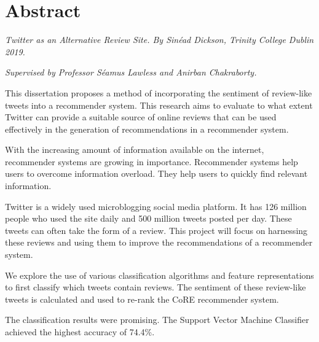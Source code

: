 \chapter{Abstract}


\emph{Twitter as an Alternative Review Site. By Sinéad Dickson, Trinity College Dublin 2019.}

\emph{Supervised by Professor Séamus Lawless and Anirban Chakraborty.}

This dissertation proposes a method of incorporating the sentiment of review-like tweets into a recommender system. This research aims to evaluate to what extent Twitter can provide a suitable source of online reviews that can be used effectively in the generation of recommendations in a recommender system. 

With the increasing amount of information available on the internet, recommender systems are growing in importance. Recommender systems help users to overcome information overload. They help users to quickly find relevant information.


Twitter is a widely used microblogging social media platform. It has 126 million people who used the site daily and 500 million tweets posted per day. These tweets can often take the form of a review. This project will focus on harnessing these reviews and using them to improve the recommendations of a recommender system.

We explore the use of various classification algorithms and feature representations to first classify which tweets contain reviews. The sentiment of these review-like tweets is calculated and used to re-rank the CoRE recommender system.

The classification results were promising. The Support Vector Machine Classifier achieved the highest accuracy of 74.4\%.









